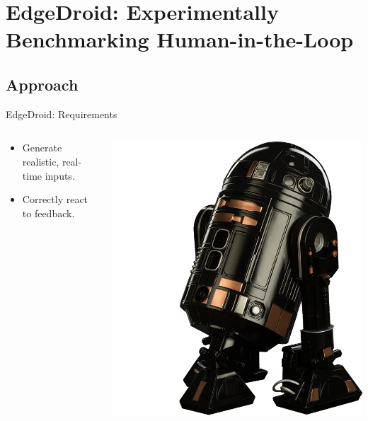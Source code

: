 \documentclass[aspectratio=1610]{beamer}
\begin{document}
\section{EdgeDroid: Experimentally Benchmarking Human-in-the-Loop}
\subsection{Approach}

\begin{frame}{EdgeDroid: Requirements}
    \begin{columns}[onlytextwidth]
        \begin{column}{.5\linewidth}
            \begin{itemize}
                \itemsep2em
                \item Generate realistic, real-time inputs.
                \item Correctly react to feedback.
            \end{itemize}
        \end{column}%
        \begin{column}{.5\linewidth}
            \centering%
            \includegraphics[width=.7\linewidth]{img/astromech.png}
        \end{column}
    \end{columns}
\end{frame}
\end{document}
